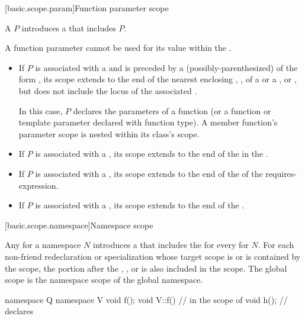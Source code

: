 [basic.scope.param]{Function parameter scope}

%
%

\pnum
A  $P$ introduces
a  that includes $P$.
\begin{note}
A function parameter cannot be used for its value
within the .
\end{note}
\begin{itemize}
\item
If $P$ is associated with a  and
is preceded by a (possibly-parenthesized)  of
the form
 ,
its scope extends to the end of the nearest enclosing
,
,
 of a  or
a , or
,
but does not include the locus of the associated .
\begin{note}
In this case, $P$ declares the parameters of a function
(or a function or template parameter declared with function type).
A member function's parameter scope is nested within its class's scope.
\end{note}
\item
If $P$ is associated with a ,
its scope extends to the end of the 
in the .
\item
If $P$ is associated with a ,
its scope extends to the end of the  of the requires-expression.
\item
If $P$ is associated with a ,
its scope extends to the end of the .
\end{itemize}

[basic.scope.namespace]{Namespace scope}

\pnum
Any  for a namespace $N$ introduces
a 
that includes the 
for every  for $N$.
For each non-friend redeclaration or specialization
whose target scope is or is contained by the scope,
the portion after the
,
, or
is also included in the scope.
The global scope is
the namespace scope of the global namespace.
\begin{example}
\begin{codeblock}
namespace Q {
  namespace V { void f(); }
  void V::f() {         // in the scope of 
    void h();           // declares 
  }
}
\end{codeblock}
\end{example}

